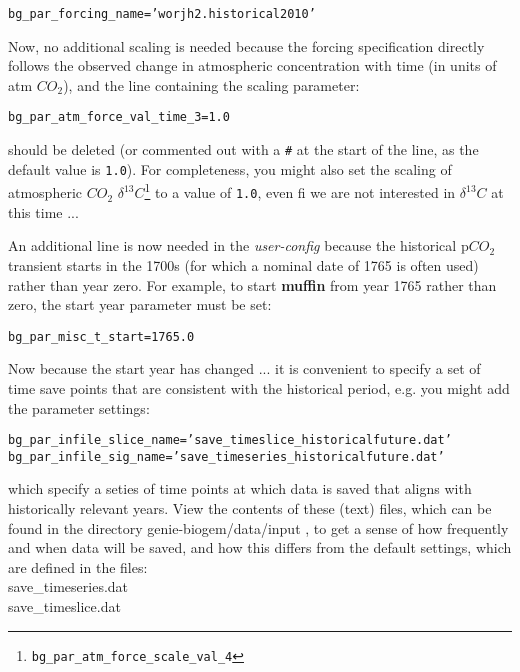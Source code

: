 \documentclass[11pt,fleqn]{book} %
\begin{document}
\vspace{-2pt}\begin{verbatim}
bg_par_forcing_name=’worjh2.historical2010’
\end{verbatim}\vspace{-2pt}
Now, no additional scaling is needed because the forcing specification directly follows the observed change in atmospheric concentration with time (in units of atm \(CO_{2}\)), and the line containing the scaling parameter: 
\vspace{-2pt}\begin{verbatim}
bg_par_atm_force_val_time_3=1.0
\end{verbatim}\vspace{-2pt}
should be deleted (or commented out with a \texttt{\#} at the start of the line, as the default value is \texttt{1.0}).
For completeness, you might also set the scaling of atmospheric \(CO_{2}\) \(\delta^{13}C\)\footnote{\texttt{bg\_par\_atm\_force\_scale\_val\_4}} to a value of \texttt{1.0}, even fi we are not interested in \(\delta^{13}C\) at this time ... 

An additional line is now needed in the \textit{user-config} because the historical p\(CO_{2}\) transient starts in the 1700s (for which a nominal date of 1765 is often used) rather than year zero. For example, to start \textbf{muffin} from year 1765 rather than zero, the start year parameter must be set:
\vspace{-2pt}\begin{verbatim}
bg_par_misc_t_start=1765.0
\end{verbatim}\vspace{-2pt}
Now because the start year has changed ... it is convenient to specify a set of time save points that are consistent with the historical period, e.g. you might add the parameter settings:
\vspace{-2pt}\begin{verbatim}
bg_par_infile_slice_name=’save_timeslice_historicalfuture.dat’
bg_par_infile_sig_name=’save_timeseries_historicalfuture.dat’
\end{verbatim}\vspace{-2pt}
which specify a seties of time points at which data is saved that aligns with historically relevant years. View the contents of these (text) files, which can be found in the directory \footnotesize\textsf{genie-biogem/data/input }\normalsize, to get a sense of how frequently and when data will be saved, and how this differs from the default settings, which are defined in the files:
\vspace{2pt}
\\ \footnotesize\textsf{save\_timeseries.dat }\normalsize
\\ \footnotesize\textsf{save\_timeslice.dat }\normalsize
\vspace{2pt}
\end{document}
